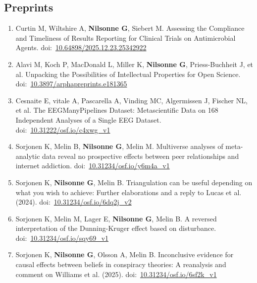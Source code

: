 \documentclass[11pt,a4paper]{article}
\begin{document}
\subsection*{Preprints}
\begin{enumerate}

\item Curtin M, Wiltshire A, \textbf{Nilsonne G}, Siebert M. Assessing the Compliance and Timeliness of Results Reporting for Clinical Trials on Antimicrobial Agents. doi:~\href{https://doi.org/10.64898/2025.12.23.25342922}{10.64898/2025.12.23.25342922}

\item Alavi M, Koch P, MacDonald L, Miller K, \textbf{Nilsonne G}, Priess-Buchheit J, et al. Unpacking the Possibilities of Intellectual Properties for Open Science. doi:~\href{https://doi.org/10.3897/arphapreprints.e181365}{10.3897/arphapreprints.e181365}

\item Cesnaite E, vitale A, Pascarella A, Vinding MC, Algermissen J, Fischer NL, et al. The EEGManyPipelines Dataset: Metascientific Data on 168 Independent Analyses of a Single EEG Dataset. doi:~\href{https://doi.org/10.31222/osf.io/c4xwg_v1}{10.31222/osf.io/c4xwg\_v1}

\item Sorjonen K, Melin B, \textbf{Nilsonne G}, Melin M. Multiverse analyses of meta-analytic data reveal no prospective effects between peer relationships and internet addiction. doi:~\href{https://doi.org/10.31234/osf.io/y6m4a_v1}{10.31234/osf.io/y6m4a\_v1}

\item Sorjonen K, \textbf{Nilsonne G}, Melin B. Triangulation can be useful depending on what you wish to achieve: Further elaborations and a reply to Lucas et al. (2024). doi:~\href{https://doi.org/10.31234/osf.io/6dq2j_v2}{10.31234/osf.io/6dq2j\_v2}

\item Sorjonen K, Melin M, Lager E, \textbf{Nilsonne G}, Melin B. A reversed interpretation of the Dunning-Kruger effect based on disturbance. doi:~\href{https://doi.org/10.31234/osf.io/sqy69_v1}{10.31234/osf.io/sqy69\_v1}

\item Sorjonen K, \textbf{Nilsonne G}, Olsson A, Melin B. Inconclusive evidence for causal effects between beliefs in conspiracy theories: A reanalysis and comment on Williams et al. (2025). doi:~\href{https://doi.org/10.31234/osf.io/6sf2k_v1}{10.31234/osf.io/6sf2k\_v1}


\end{enumerate}
\end{document}
